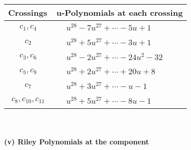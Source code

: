 \documentclass[1p]{elsarticle_modified}
\theoremstyle{definition}
\begin{document}
\begin{tabular}{m{50pt}|m{274pt}}
Crossings & \hspace{64pt}u-Polynomials at each crossing \\
\hline $$\begin{aligned}c_{1},c_{4}\end{aligned}$$&$\begin{aligned}
&u^{28}-7 u^{27}+\cdots-5 u+1
\end{aligned}$\\
\hline $$\begin{aligned}c_{2}\end{aligned}$$&$\begin{aligned}
&u^{28}+5 u^{27}+\cdots-3 u+1
\end{aligned}$\\
\hline $$\begin{aligned}c_{3},c_{6}\end{aligned}$$&$\begin{aligned}
&u^{28}-2 u^{27}+\cdots-24 u^2-32
\end{aligned}$\\
\hline $$\begin{aligned}c_{5},c_{9}\end{aligned}$$&$\begin{aligned}
&u^{28}+2 u^{27}+\cdots+20 u+8
\end{aligned}$\\
\hline $$\begin{aligned}c_{7}\end{aligned}$$&$\begin{aligned}
&u^{28}+3 u^{27}+\cdots- u-1
\end{aligned}$\\
\hline $$\begin{aligned}c_{8},c_{10},c_{11}\end{aligned}$$&$\begin{aligned}
&u^{28}+5 u^{27}+\cdots-8 u-1
\end{aligned}$\\
\hline
\end{tabular}\\~\\
\newpage\renewcommand{\arraystretch}{1}
\flushleft \textbf{(v) Riley Polynomials at the component}\newline \\
\end{document}
